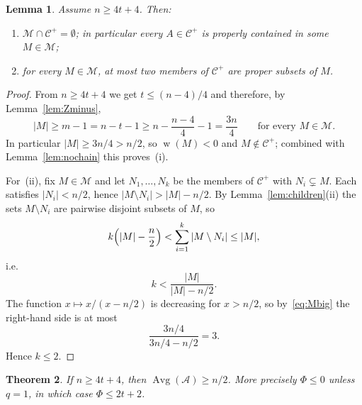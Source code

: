 \documentclass[11pt,a4paper]{amsart}
\theoremstyle{plain}
\newtheorem{theorem}{Theorem}[section]
\newtheorem{lemma}[theorem]{Lemma}
\theoremstyle{definition}
\newcommand{\A}{\mathcal{A}}
\newcommand{\Cc}{\mathcal{C}}
\newcommand{\Mm}{\mathcal{M}}
\newcommand{\Avg}{\operatorname{Avg}}
\newcommand{\Cp}{\Cc^{+}}
\DeclareMathOperator{\wt}{w}
\begin{document}
\begin{lemma}\label{lem:kbound}
Assume $n\ge4t+4$. Then:
\begin{enumerate}
\item[(i)] $\Mm\cap\Cp=\emptyset$; in particular every $A\in\Cp$ is properly
contained in some $M\in\Mm$;
\item[(ii)] for every $M\in\Mm$, at most two members of $\Cp$ are proper subsets
of $M$.
\end{enumerate}
\end{lemma}

\begin{proof}
From $n\ge4t+4$ we get $t\le(n-4)/4$ and therefore, by Lemma~\ref{lem:Zminus},
\begin{equation}\label{eq:Mbig}
  |M|\ge m-1=n-t-1\ge n-\frac{n-4}{4}-1=\frac{3n}{4}
  \qquad\text{for every }M\in\Mm.
\end{equation}
In particular $|M|\ge3n/4>n/2$, so $\wt(M)<0$ and $M\notin\Cp$; combined with
Lemma~\ref{lem:nochain} this proves~(i).

For~(ii), fix $M\in\Mm$ and let $N_1,\dots,N_k$ be the members of $\Cp$ with
$N_i\subsetneq M$. Each satisfies $|N_i|<n/2$, hence
$|M\setminus N_i|>|M|-n/2$. By Lemma~\ref{lem:children}(ii) the sets
$M\setminus N_i$ are pairwise disjoint subsets of $M$, so
\[
  k\Bigl(|M|-\frac n2\Bigr)
  <
  \sum_{i=1}^k|M\setminus N_i|
  \le |M|,
\]
i.e.
\[
  k<\frac{|M|}{|M|-n/2}.
\]
The function $x\mapsto x/(x-n/2)$ is decreasing for $x>n/2$, so by~\eqref{eq:Mbig}
the right-hand side is at most
\[
  \frac{3n/4}{3n/4-n/2}=3.
\]
Hence $k\le2$.
\end{proof}

\begin{theorem}\label{thm:A}
If $n\ge4t+4$, then $\Avg(\A)\ge n/2$. More precisely $\Phi\le0$ unless $q=1$,
in which case $\Phi\le2t+2$.
\end{theorem}
\end{document}
